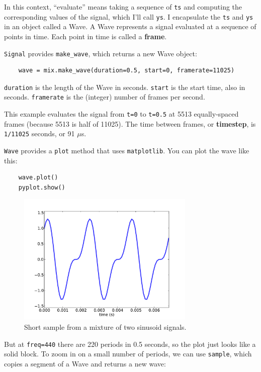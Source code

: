 \documentclass[12pt]{book}
\begin{document}
In this context, ``evaluate'' means taking a sequence of {\tt ts}
and computing the corresponding values of the signal, which I'll
call {\tt ys}.  I encapsulate the {\tt ts} and {\tt ys} in an
object called a Wave.
A Wave represents a signal evaluated at a sequence of points in
time.  Each point in time is called a {\bf frame}.

{\tt Signal} provides \verb"make_wave", which returns a new
Wave object:

\begin{verbatim}
    wave = mix.make_wave(duration=0.5, start=0, framerate=11025)
\end{verbatim}

{\tt duration} is the length of the Wave in seconds.  {\tt start} is
the start time, also in seconds.  {\tt framerate} is the (integer)
number of frames per second.

This example evaluates the signal from {\tt t=0} to {\tt t=0.5} at
5513 equally-spaced frames (because 5513 is half of 11025).
The time between frames, or {\bf timestep}, is {\tt 1/11025} seconds, or
91 $\mu$s.

{\tt Wave} provides a {\tt plot} method that uses {\tt matplotlib}.
You can plot the wave like this:

\begin{verbatim}
    wave.plot()
    pyplot.show()
\end{verbatim}

\begin{figure}
\centerline{\includegraphics[height=2.5in]{figs/example1.pdf}}
\caption{Short sample from a mixture of two sinusoid signals.}
\label{fig.example1}
\end{figure}

But at {\tt freq=440} there are 220 periods in 0.5 seconds,
so the plot just looks like a solid block.  To zoom in on a small
number of periods, we can use {\tt sample}, which copies a segment
of a Wave and returns a new wave:
\end{document}
